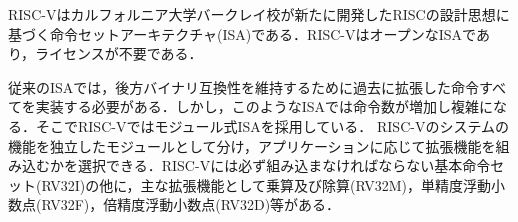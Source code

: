 
RISC-Vはカルフォルニア大学バークレイ校が新たに開発したRISCの設計思想に基づく命令セットアーキテクチャ(ISA)である．RISC-VはオープンなISAであり，ライセンスが不要である．

従来のISAでは，後方バイナリ互換性を維持するために過去に拡張した命令すべてを実装する必要がある．しかし，このようなISAでは命令数が増加し複雑になる．そこでRISC-Vではモジュール式ISAを採用している．%
RISC-Vのシステムの機能を独立したモジュールとして分け，アプリケーションに応じて拡張機能を組み込むかを選択できる．RISC-Vには必ず組み込まなければならない基本命令セット(RV32I)の他に，主な拡張機能として乗算及び除算(RV32M)，単精度浮動小数点(RV32F)，倍精度浮動小数点(RV32D)等がある．

